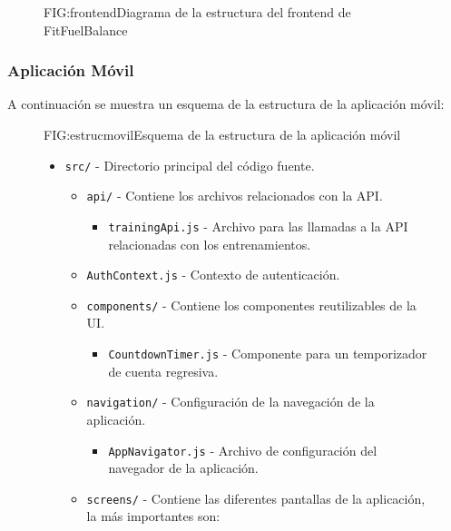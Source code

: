 \begin{figure}[Diagrama de la estructura del frontend]{FIG:frontend}{Diagrama de la estructura del frontend de FitFuelBalance}
\end{figure}
\newpage

\subsubsection{Aplicación Móvil}

A continuación se muestra un esquema de la estructura de la aplicación móvil:

\begin{figure}[Estructura de aplicación móvil]{FIG:estrucmovil}{Esquema de la estructura de la aplicación móvil}
    \begin{itemize}
        \item \texttt{src/} - Directorio principal del código fuente.
        \begin{itemize}
            \item \texttt{api/} - Contiene los archivos relacionados con la API.
            \begin{itemize}
                \item \texttt{trainingApi.js} - Archivo para las llamadas a la API relacionadas con los entrenamientos.
            \end{itemize}
            \item \texttt{AuthContext.js} - Contexto de autenticación.
            \item \texttt{components/} - Contiene los componentes reutilizables de la UI.
            \begin{itemize}
                \item \texttt{CountdownTimer.js} - Componente para un temporizador de cuenta regresiva.
            \end{itemize}
            \item \texttt{navigation/} - Configuración de la navegación de la aplicación.
            \begin{itemize}
                \item \texttt{AppNavigator.js} - Archivo de configuración del navegador de la aplicación.
            \end{itemize}
            \item \texttt{screens/} - Contiene las diferentes pantallas de la aplicación, la más importantes son:
            \begin{itemize}

\end{itemize}
\end{itemize}
\end{itemize}
\end{figure}
